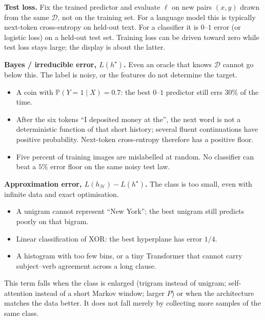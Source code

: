 \documentclass[11pt,a4paper]{article}
\theoremstyle{definition}
\begin{document}
\begin{note}\label{note:spr2025-nlp-error-decomp}
\textbf{Test loss.} Fix the trained predictor and evaluate \(\ell\) on new pairs \((x,y)\) drawn from the same \(\mathcal{D}\), not on the training set. For a language model this is typically next-token cross-entropy on held-out text. For a classifier it is \(0\)--\(1\) error (or logistic loss) on a held-out test set. Training loss can be driven toward zero while test loss stays large; the display is about the latter.

\textbf{Bayes / irreducible error, \(L(h^\star)\).} Even an oracle that knows \(\mathcal{D}\) cannot go below this. The label is noisy, or the features do not determine the target.
\begin{itemize}
  \item A coin with \(\mathbb{P}(Y=1\mid X)=0.7\): the best \(0\)--\(1\) predictor still errs \(30\%\) of the time.
  \item After the six tokens ``I deposited money at the'', the next word is not a deterministic function of that short history; several fluent continuations have positive probability. Next-token cross-entropy therefore has a positive floor.
  \item Five percent of training images are mislabelled at random. No classifier can beat a \(5\%\) error floor on the same noisy test law.
\end{itemize}

\textbf{Approximation error, \(L(h_{\mathcal{H}})-L(h^\star)\).} The class is too small, even with infinite data and exact optimisation.
\begin{itemize}
  \item A unigram cannot represent ``New York''; the best unigram still predicts poorly on that bigram.
  \item Linear classification of XOR: the best hyperplane has error \(1/4\).
  \item A histogram with too few bins, or a tiny Transformer that cannot carry subject--verb agreement across a long clause.
\end{itemize}
This term falls when the class is enlarged (trigram instead of unigram; self-attention instead of a short Markov window; larger \(P\)) or when the architecture matches the data better. It does not fall merely by collecting more samples of the same class.


\end{note}
\end{document}
